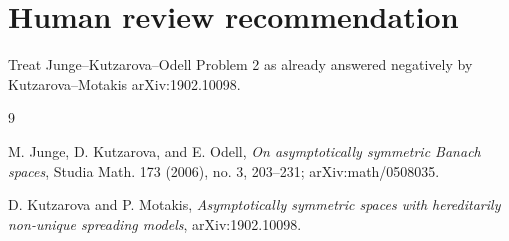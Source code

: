 \documentclass[11pt]{article}
\begin{document}
\section*{Human review recommendation}

Treat Junge--Kutzarova--Odell Problem 2 as already answered negatively by
Kutzarova--Motakis arXiv:1902.10098.

\begin{thebibliography}{9}

M. Junge, D. Kutzarova, and E. Odell,
\emph{On asymptotically symmetric Banach spaces},
Studia Math. 173 (2006), no. 3, 203--231; arXiv:math/0508035.

D. Kutzarova and P. Motakis,
\emph{Asymptotically symmetric spaces with hereditarily non-unique spreading
models},
arXiv:1902.10098.

\end{thebibliography}
\end{document}
